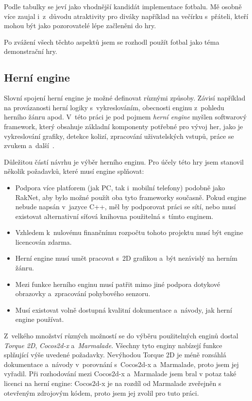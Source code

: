 \documentclass[thesis=B,czech,hidelinks]{FITthesis}[2012/06/26] %
\begin{document}
Podle tabulky se jeví jako vhodnější kandidát implementace fotbalu. Mě osobně více zaujal i~z~důvodu atraktivity pro diváky například na večírku s~přáteli, kteří mohou být jako pozorovatelé lépe začleněni do hry. 

Po zvážení všech těchto aspektů jsem se rozhodl použít fotbal jako téma demonstrační hry.

\subsection{Herní engine}

Slovní spojení herní engine je možné definovat různými způsoby. Závisí například na provázanosti herní logiky s~vykreslováním, obecnosti enginu z~pohledu herního žánru apod. V~této práci je pod pojmem \textit{herní engine} myšlen softwarový framework, který obsahuje základní komponenty potřebné pro vývoj her, jako je vykreslování grafiky, detekce kolizí, zpracování uživatelských vstupů, práce se zvukem a~další~\cite{gameengine}.

Důležitou částí návrhu je výběr herního enginu. Pro účely této hry jsem stanovil několik požadavků, které musí engine splňovat:

\begin{itemize}
	\item Podpora více platforem (jak PC, tak i~mobilní telefony) podobně jako RakNet, aby bylo možné použít oba tyto frameworky současně. Pokud engine nebude napsán v~jazyce C++, měl by podporovat práci se sítí, nebo musí existovat alternativní síťová knihovna použitelná s~tímto enginem.
	\item Vzhledem k~nulovému finančnímu rozpočtu tohoto projektu musí být engine licencován zdarma.
	\item Herní engine musí umět pracovat s~2D grafikou a~být nezávislý na herním žánru.
	\item Mezi funkce herního enginu musí patřit mimo jiné podpora dotykové obrazovky a~zpracování pohybového senzoru.
	\item Musí existovat volně dostupná kvalitní dokumentace a~návody, jak herní engine používat.
\end{itemize}

Z~velkého množství různých možností se do výběru použitelných enginů dostal \textit{Torque 2D}, \textit{Cocos2d-x} a~\textit{Marmalade}. Všechny tyto enginy nabízejí funkce splňující výše uvedené požadavky. Nevýhodou Torque 2D je méně rozsáhlá dokumentace a~návody v~porovnání s~Cocos2d-x a~Marmalade, proto jsem jej vyřadil. Při rozhodování mezi Cocos2d-x a~Marmalade jsem bral v potaz také licenci na herní engine: Cocos2d-x je na rozdíl od Marmalade zveřejněn s otevřeným zdrojovým kódem, proto jsem jej zvolil pro tuto práci.
\end{document}
